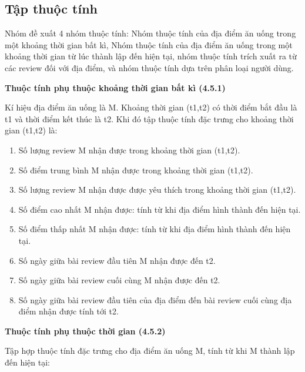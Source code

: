 \documentclass[12pt]{extarticle}
\begin{document}
		\subsection{Tập thuộc tính}
			\par Nhóm đề xuất 4 nhóm thuộc tính: Nhóm thuộc tính của địa điểm ăn uống trong một khoảng thời gian bất kì, Nhóm thuộc tính của địa điểm ăn uống trong một khoảng thời gian từ lúc thành lập đến hiện tại, nhóm thuộc tính trích xuất ra từ các review đối với địa điểm, và nhóm thuộc tính dựa trên phân loại người dùng. 
			\par \textbf{Thuộc tính phụ thuộc khoảng thời gian bất kì (4.5.1)}
				\par Kí hiệu địa điểm ăn uống là M. Khoảng thời gian (t1,t2) có thời điểm bắt đầu là t1 và thời điểm kết thúc là t2. Khi đó tập thuộc tính đặc trưng cho khoảng thời gian (t1,t2) là:
				\begin{enumerate}
					\item Số lượng review M nhận được trong khoảng thời gian (t1,t2).
					\item Số điểm trung bình M nhận được trong khoảng thời gian (t1,t2).
					\item Số lượng review M nhận được được yêu thích trong khoảng thời gian (t1,t2).
					\item Số điểm cao nhất M nhận được: tính từ khi địa điểm hình thành đến hiện tại.	
					\item Số điểm thấp nhất M nhận được: tính từ khi địa điểm hình thành đến hiện tại.
					\item Số ngày giữa bài review đầu tiên M nhận được đến t2.
					\item Số ngày giữa bài review cuối cùng M nhận được đến t2.
					\item Số ngày giữa bài review đầu tiên của địa điểm đến bài review cuối cùng địa điểm nhận được tính tới t2.
				\end{enumerate}
			\par \textbf{Thuộc tính phụ thuộc thời gian (4.5.2)}
				\par Tập hợp thuộc tính đặc trưng cho địa điểm ăn uống M, tính từ khi M thành lập đến hiện tại:
\end{document}
